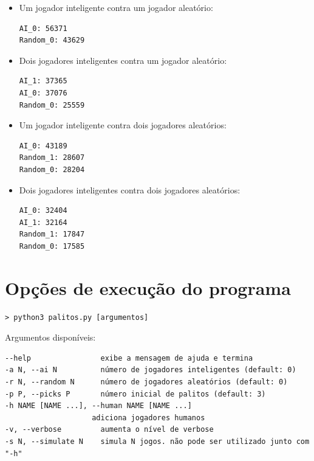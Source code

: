 \documentclass{article}
\begin{document}
\begin{itemize}

\item Um jogador inteligente contra um jogador aleatório:

\begin{verbatim}
AI_0: 56371
Random_0: 43629
\end{verbatim}


\item Dois jogadores inteligentes contra um jogador aleatório:

\begin{verbatim}
AI_1: 37365
AI_0: 37076
Random_0: 25559
\end{verbatim}


\item Um jogador inteligente contra dois jogadores aleatórios:

\begin{verbatim}
AI_0: 43189
Random_1: 28607
Random_0: 28204
\end{verbatim}


\item Dois jogadores inteligentes contra dois jogadores aleatórios:

\begin{verbatim}
AI_0: 32404
AI_1: 32164
Random_1: 17847
Random_0: 17585
\end{verbatim}

\end{itemize}


\section{Opções de execução do programa}

\begin{verbatim}
> python3 palitos.py [argumentos]
\end{verbatim}

Argumentos disponíveis:

\begin{verbatim}
--help                exibe a mensagem de ajuda e termina
-a N, --ai N          número de jogadores inteligentes (default: 0)
-r N, --random N      número de jogadores aleatórios (default: 0)
-p P, --picks P       número inicial de palitos (default: 3)
-h NAME [NAME ...], --human NAME [NAME ...]
                    adiciona jogadores humanos
-v, --verbose         aumenta o nível de verbose
-s N, --simulate N    simula N jogos. não pode ser utilizado junto com "-h"

\end{verbatim}
\end{document}
